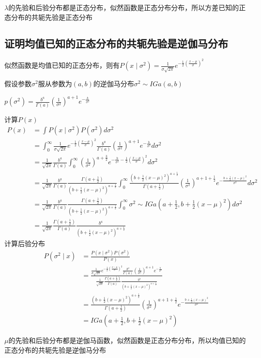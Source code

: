 \documentclass[12pt, a4paper, oneside, fontset=windows]{ctexart}
\begin{document}
$\lambda$的先验和后验分布都是正态分布，似然函数是正态分布分布，所以方差已知的正态分布的共轭先验是正态分布

\subsection{证明均值已知的正态分布的共轭先验是逆伽马分布}
似然函数是均值已知的正态分布，则有$P(x\mid \sigma^2)=\frac{1}{\sigma \sqrt{2 \pi}} e^{-\frac{1}{2}\left(\frac{x-\mu}{\sigma}\right)^{2}}$

假设参数$\sigma^2$服从参数为$(a,b)$的逆伽马分布$\sigma^2 \sim IGa(a,b)$

$p(\sigma^2)=\frac{b^a}{\Gamma(a)}\left(\frac{1}{\sigma^2}\right)^{a+1} e^{-\frac{b}{\sigma^2}}$

计算$P(x)$
\begin{align*}
    P(x) &= \int P(x\mid \sigma^2) P(\sigma^2) d\sigma^2\\
    &=\int_{0}^{\infty}\frac{1}{\sigma \sqrt{2 \pi}} e^{-\frac{1}{2}\left(\frac{x-\mu}{\sigma}\right)^{2}} \frac{b^a}{\Gamma(a)}\left(\frac{1}{\sigma^2}\right)^{a+1} e^{-\frac{b}{\sigma^2}} d\sigma^2\\
    &=\frac{1}{\sqrt{2 \pi}}\frac{b^a}{\Gamma(a)}\int_{0}^{\infty}\left(\frac{1}{\sigma^2}\right)^{a+\frac{3}{2}} e^{-\frac{b}{\sigma^2}-\frac{1}{2}\left(\frac{x-\mu}{\sigma}\right)^{2}} d\sigma^2\\
    &= \frac{1}{\sqrt{2 \pi}}\frac{b^a}{\Gamma(a)}\frac{\Gamma(a+\frac{1}{2})}{\left(b+\frac{1}{2}\left(x-\mu\right)^{2}\right)^{a+\frac{1}{2}}}\int_{0}^{\infty}\frac{\left(b+\frac{1}{2}\left(x-\mu\right)^{2}\right)^{a+\frac{1}{2}}}{\Gamma(a+\frac{1}{2})}\left(\frac{1}{\sigma^2}\right)^{a+1+\frac{1}{2}} e^{-\frac{b+\frac{1}{2}\left(x-\mu\right)^{2}}{\sigma^2}} d\sigma^2\\
    &=\frac{1}{\sqrt{2 \pi}}\frac{b^a}{\Gamma(a)}\frac{\Gamma(a+\frac{1}{2})}{\left(b+\frac{1}{2}\left(x-\mu\right)^{2}\right)^{a+\frac{1}{2}}}\int_{0}^{\infty}\sigma^2 \sim IGa\left(a+\frac{1}{2},b+\frac{1}{2}\left(x-\mu\right)^{2}\right) d\sigma^2\\
    &=\frac{1}{\sqrt{2 \pi}}\frac{\Gamma(a+\frac{1}{2})}{\Gamma(a)}\frac{b^a}{\left(b+\frac{1}{2}\left(x-\mu\right)^{2}\right)^{a+\frac{1}{2}}}
\end{align*}
计算后验分布
\begin{align*}
    P(\sigma^2\mid x) &= \frac{P(x\mid \sigma^2)P(\sigma^2)}{P(x)}\\
    &=\frac{\frac{1}{\sigma \sqrt{2 \pi}} e^{-\frac{1}{2}\left(\frac{x-\mu}{\sigma}\right)^{2}} \frac{b^a}{\Gamma(a)}\left(\frac{1}{\sigma^2}\right)^{a+1} e^{-\frac{b}{\sigma^2}}}{\frac{1}{\sqrt{2 \pi}}\frac{\Gamma(a+\frac{1}{2})}{\Gamma(a)}\frac{b^a}{\left(b+\frac{1}{2}\left(x-\mu\right)^{2}\right)^{a+\frac{1}{2}}}}\\
    &=\frac{\left(b+\frac{1}{2}\left(x-\mu\right)^{2}\right)^{a+\frac{1}{2}}}{\Gamma(a+\frac{1}{2})}\left(\frac{1}{\sigma^2}\right)^{a+1+\frac{1}{2}}e^{-\frac{b+\frac{1}{2}\left(x-\mu\right)^{2}}{\sigma^2}}\\
    &=IGa\left(a+\frac{1}{2},b+\frac{1}{2}\left(x-\mu\right)^{2}\right)
\end{align*}

$\mu$的先验和后验分布都是逆伽马函数，似然函数是正态分布分布，所以均值已知的正态分布的共轭先验是逆伽马分布
\end{document}
